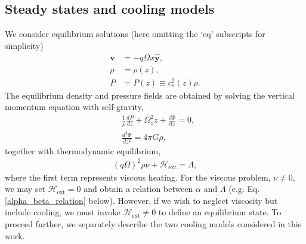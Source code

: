 
\subsection{Steady states and cooling models}
We consider equilibrium solutions (here omitting the `eq' subscripts
for simplicity)  
\begin{align}
  \bm{v} &= -q\Omega x \hat{\bm{y}}, \\
  \rho   &= \rho(z),\\
  P      &= P(z) \equiv c_s^2(z)\rho.
\end{align} 
The equilibrium density and pressure fields are obtained by solving
the vertical momentum equation with self-gravity,
\begin{align}
  &\frac{1}{\rho}\frac{dP}{dz} +
  \Omega_z^2z + \frac{d\Phi}{dz} = 0, \label{vert_eq1}\\
 &\frac{d^2\Phi}{dz^2} = 4 \pi G \rho,\label{vert_eq2}
\end{align}
together with thermodynamic equilibrium,
\begin{align}\label{thermal_eq}
(q\Omega)^2\rho\nu + \mathcal{H}_\mathrm{ext} = \Lambda,
\end{align}
where the first term represents viscous heating. For the viscous
problem, $\nu\neq0$, we may set $\mathcal{H}_\mathrm{ext}=0$ and
obtain a relation between $\alpha$ and $\Lambda$
(e.g. Eq. \ref{alpha_beta_relation} below). However,
if we wish to neglect viscosity but include cooling, we must invoke
$\mathcal{H}_\mathrm{ext}\neq0$ to define an equilibrium state.  
To proceed further, we separately describe the two cooling models
considered in this work. 

